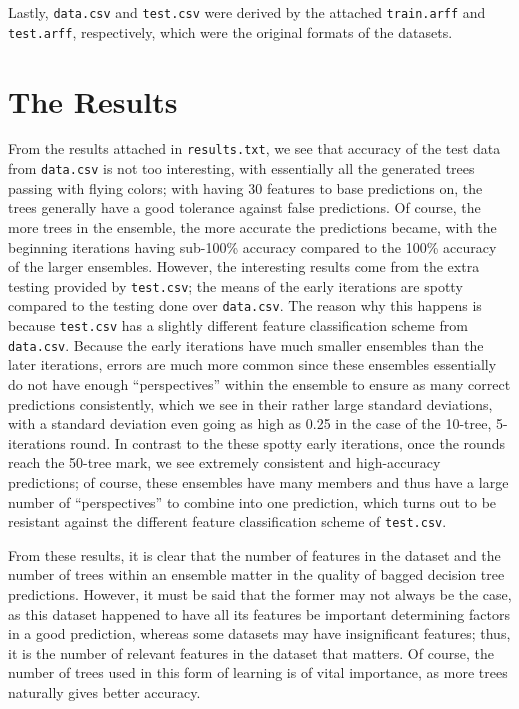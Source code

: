 \documentclass[12pt]{article}
\begin{document}
  Lastly, \verb|data.csv| and \verb|test.csv| were derived by the attached \verb|train.arff| and \verb|test.arff|, respectively, which were the original formats of the datasets.

  \section{The Results}
  From the results attached in \verb|results.txt|, we see that accuracy of the test data from \verb|data.csv| is not too interesting, with essentially all the generated trees passing with flying colors; with having 30 features to base predictions on, the trees generally have a good tolerance against false predictions. Of course, the more trees in the ensemble, the more accurate the predictions became, with the beginning iterations having sub-100\% accuracy compared to the 100\% accuracy of the larger ensembles. However, the interesting results come from the extra testing provided by \verb|test.csv|; the means of the early iterations are spotty compared to the testing done over \verb|data.csv|. The reason why this happens is because \verb|test.csv| has a slightly different feature classification scheme from \verb|data.csv|. Because the early iterations have much smaller ensembles than the later iterations, errors are much more common since these ensembles essentially do not have enough ``perspectives'' within the ensemble to ensure as many correct predictions consistently, which we see in their rather large standard deviations, with a standard deviation even going as high as 0.25 in the case of the 10-tree, 5-iterations round. In contrast to the these spotty early iterations, once the rounds reach the 50-tree mark, we see extremely consistent and high-accuracy predictions; of course, these ensembles have many members and thus have a large number of ``perspectives'' to combine into one prediction, which turns out to be resistant against the different feature classification scheme of \verb|test.csv|.

  From these results, it is clear that the number of features in the dataset and the number of trees within an ensemble matter in the quality of bagged decision tree predictions. However, it must be said that the former may not always be the case, as this dataset happened to have all its features be important determining factors in a good prediction, whereas some datasets may have insignificant features; thus, it is the number of relevant features in the dataset that matters. Of course, the number of trees used in this form of learning is of vital importance, as more trees naturally gives better accuracy.
\end{document}
